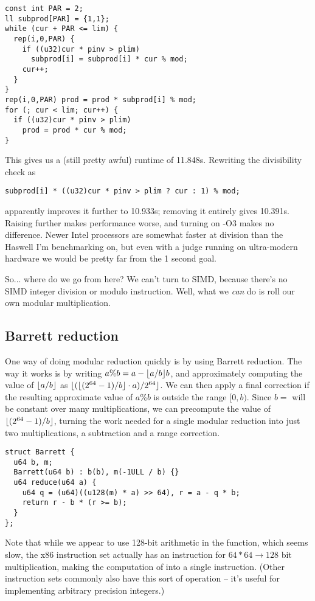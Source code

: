 \begin{lstlisting}
const int PAR = 2;
ll subprod[PAR] = {1,1};
while (cur + PAR <= lim) {
  rep(i,0,PAR) {
    if ((u32)cur * pinv > plim)
      subprod[i] = subprod[i] * cur % mod;
    cur++;
  }
}
rep(i,0,PAR) prod = prod * subprod[i] % mod;
for (; cur < lim; cur++) {
  if ((u32)cur * pinv > plim)
    prod = prod * cur % mod;
}
\end{lstlisting}

This gives us a (still pretty awful) runtime of 11.848s.
Rewriting the divisibility check as
\begin{lstlisting}
subprod[i] * ((u32)cur * pinv > plim ? cur : 1) % mod;
\end{lstlisting}
apparently improves it further to 10.933s; removing it entirely gives 10.391s.
Raising \verb@PAR@ further makes performance worse, and turning on -O3 makes no difference.
Newer Intel processors are somewhat faster at division than the Haswell I'm benchmarking on, but even with a judge running on ultra-modern hardware we would be pretty far from the 1 second goal.

So... where do we go from here?
We can't turn to SIMD, because there's no SIMD integer division or modulo instruction.
Well, what we \emph{can} do is roll our own modular multiplication.

\subsection{Barrett reduction}
One way of doing modular reduction quickly is by using Barrett reduction.
The way it works is by writing $a \% b = a - \lfloor a / b\rfloor b$, and approximately computing the value of $\lfloor a / b\rfloor$ as $\lfloor(\lfloor(2^{64} - 1) / b\rfloor \cdot a) / 2^{64}\rfloor$.
We can then apply a final correction if the resulting approximate value of $a \% b$ is outside the range $[0, b)$.
Since $b =$ \verb@mod@ will be constant over many multiplications, we can precompute the value of $\lfloor(2^{64} - 1) / b\rfloor$, turning the work needed for a single modular reduction into just two multiplications, a subtraction and a range correction.
\begin{lstlisting}
struct Barrett {
  u64 b, m;
  Barrett(u64 b) : b(b), m(-1ULL / b) {}
  u64 reduce(u64 a) {
    u64 q = (u64)((u128(m) * a) >> 64), r = a - q * b;
    return r - b * (r >= b);
  }
};
\end{lstlisting}

Note that while we appear to use 128-bit arithmetic in the \verb@reduce@ function, which seems slow, the x86 instruction set actually has an instruction for \mbox{$64*64\rightarrow128$} bit multiplication, making the computation of \verb@q@ into a single instruction.
(Other instruction sets commonly also have this sort of operation -- it's useful for implementing arbitrary precision integers.)

